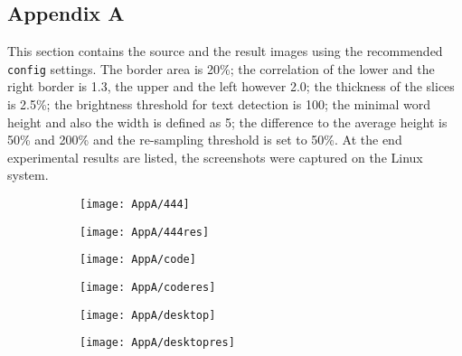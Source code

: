 \documentclass[draft,final]{vutinfth} %
\begin{document}
	\begin{appendices}
		\chapter{Appendix A}
		\label{AppA}
		This section contains the source and the result images using the recommended \texttt{config} settings.
		The border area is 20\%; the correlation of the lower and the right border is 1.3, the upper and the left however 2.0; the thickness of the slices is 2.5\%; the brightness threshold for text detection is 100; the minimal word height and also the width is defined as 5; the difference to the average height is 50\% and 200\% and the re-sampling threshold is set to 50\%.
		At the end experimental results are listed, the screenshots were captured on the Linux system.
		\begin{figure}[H]
			\centering
			\begin{subfigure}[b]{0.45\columnwidth}
				\centering
				\texttt{[image: AppA/444]}
			\end{subfigure}
			\begin{subfigure}[b]{0.45\columnwidth}
				\centering
				\texttt{[image: AppA/444res]}
			\end{subfigure}
		\end{figure}  
		\begin{figure}[H]
		\centering
		\begin{subfigure}[b]{0.45\columnwidth}
			\centering
			\texttt{[image: AppA/code]}
		\end{subfigure}
		\begin{subfigure}[b]{0.45\columnwidth}
			\centering
			\texttt{[image: AppA/coderes]}
		\end{subfigure}
		\end{figure}
		\begin{figure}[H]
		\centering
		\begin{subfigure}[b]{0.45\columnwidth}
			\centering
			\texttt{[image: AppA/desktop]}
		\end{subfigure}
		\begin{subfigure}[b]{0.45\columnwidth}
			\centering
			\texttt{[image: AppA/desktopres]}
		\end{subfigure}
		\end{figure}
		\begin{figure}[H]
		\centering
		\begin{subfigure}[b]{0.45\columnwidth}

\end{subfigure}
\end{figure}
\end{appendices}
\end{document}
